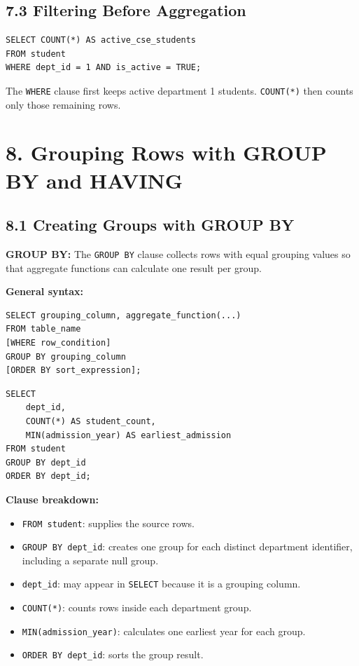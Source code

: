 \documentclass[12pt,a4paper]{article}
\newcommand{\defbox}[2]{%
  \vspace{0.2cm}
  \noindent\colorbox{boxgray}{\parbox{\dimexpr\linewidth-2\fboxsep}{%
    \textbf{#1:} #2
  }}
  \vspace{0.2cm}
}
\begin{document}
\subsection*{7.3 Filtering Before Aggregation}
\begin{verbatim}
SELECT COUNT(*) AS active_cse_students
FROM student
WHERE dept_id = 1 AND is_active = TRUE;
\end{verbatim}

\noindent The \texttt{WHERE} clause first keeps active department 1 students. \texttt{COUNT(*)}
then counts only those remaining rows.

\section*{8. Grouping Rows with GROUP BY and HAVING}

\subsection*{8.1 Creating Groups with GROUP BY}
\defbox{GROUP BY}{The \texttt{GROUP BY} clause collects rows with equal grouping values so that
aggregate functions can calculate one result per group.}

\noindent\textbf{General syntax:}
\begin{verbatim}
SELECT grouping_column, aggregate_function(...)
FROM table_name
[WHERE row_condition]
GROUP BY grouping_column
[ORDER BY sort_expression];
\end{verbatim}

\begin{verbatim}
SELECT
    dept_id,
    COUNT(*) AS student_count,
    MIN(admission_year) AS earliest_admission
FROM student
GROUP BY dept_id
ORDER BY dept_id;
\end{verbatim}

\noindent\textbf{Clause breakdown:}
\begin{itemize}
    \item \texttt{FROM student}: supplies the source rows.
    \item \texttt{GROUP BY dept\_id}: creates one group for each distinct department identifier,
    including a separate null group.
    \item \texttt{dept\_id}: may appear in \texttt{SELECT} because it is a grouping column.
    \item \texttt{COUNT(*)}: counts rows inside each department group.
    \item \texttt{MIN(admission\_year)}: calculates one earliest year for each group.
    \item \texttt{ORDER BY dept\_id}: sorts the group result.
\end{itemize}
\end{document}
